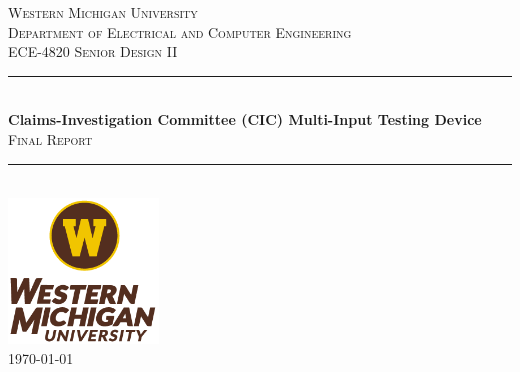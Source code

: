\documentclass[12pt]{article}
\begin{document}
\begin{titlepage}
  \newcommand{\HRule}{\rule{\linewidth}{0.5mm}} %

  \center %


  \textsc{\LARGE Western Michigan University}\\[0.5cm]
  \textsc{\Large Department of Electrical and Computer Engineering}\\[0.5cm] 
  \textsc{\large ECE-4820 Senior Design II}\\[0.5cm] 


  \HRule \\[0.4cm]
  { \huge \bfseries  Claims-Investigation Committee (CIC) Multi-Input Testing Device}\\[0.4cm]  
  \textsc{\Large Final Report }\\[0.4cm] 
  \HRule \\[1.5cm]


  \includegraphics[width=0.3\textwidth]{./../assets/WMU_Logo.png}\\[1cm]  

  {\large \today}\\[1cm] 


\end{titlepage}
\end{document}

